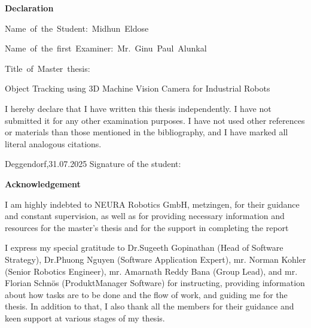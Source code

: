 \documentclass[12pt]{article}
\begin{document}
\linespread{1.5}

\textbf{Declaration}

\vspace{0.5cm}

\mbox{Name of the Student: Midhun Eldose}

\vspace{0.5cm}

\mbox{Name of the first Examiner:  Mr. Ginu Paul Alunkal }

\vspace{1 cm}

\mbox{Title of Master thesis:}

\vspace{0.5 cm}

Object Tracking using 3D Machine Vision Camera for Industrial Robots
\vspace{1.5 cm}

 I hereby declare that I have written this thesis independently. I have not submitted it for any other examination purposes. I have not used other references or materials than those mentioned in the bibliography, and I have marked all literal analogous citations.

 \vspace{1.5 cm}

Deggendorf,31.07.2025
\hspace{4 cm}
Signature of the student:


\linespread{1.5}
\newpage

\tableofcontents
\newpage
\lisToFfigures
{}
\newpage
\lisToFtables
{}
\newpage

\newpage

\begin{center}
    \textbf{Acknowledgement}
\end{center}
    

    I am highly indebted to NEURA Robotics GmbH, metzingen, for their guidance and constant supervision, as well as for providing necessary information and resources for the master's thesis and for the support in completing the report

    \vspace{1cm}
    
    I express my special gratitude to Dr.Sugeeth Gopinathan (Head of Software Strategy), Dr.Phuong Nguyen (Software Application Expert), mr. Norman Kohler (Senior Robotics Engineer), mr. Amarnath Reddy Bana (Group Lead), and mr. Florian Schnös (ProduktManager Software) for instructing, providing information about how tasks are to be done and the flow of work, and guiding me for the thesis. In addition to that, I also thank all the members for their guidance and keen support at various stages of my thesis.
\end{document}

